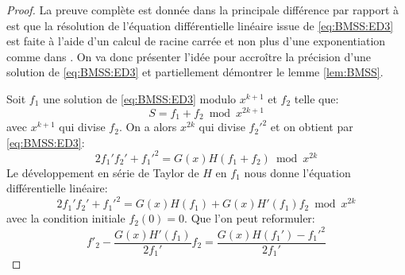\documentclass[10pt,a4paper]{book}
\theoremstyle{plain}
\theoremstyle{definition}
\theoremstyle{definition}
\theoremstyle{definition}
\theoremstyle{definition}
\theoremstyle{remark}
\theoremstyle{remark}
\begin{document}
\begin{proof}
La preuve complète est donnée dans \cite{Lercier-Sirvent2008} la principale différence par rapport à \cite{BMSS08} est que la résolution de l'équation différentielle linéaire issue de \eqref{eq:BMSS:ED3} est faite à l'aide d'un calcul de racine carrée et non plus d'une exponentiation comme dans \cite{BMSS08}. 
On va donc présenter l'idée pour accroître la précision d'une solution de \eqref{eq:BMSS:ED3} et partiellement démontrer le lemme \ref{lem:BMSS}.

Soit $f_1$ une solution de \eqref{eq:BMSS:ED3} modulo $x^{k+1}$ et $f_2$ telle que:
\begin{equation}
S=f_1+f_2 \bmod x^{2k+1}
\end{equation}
avec $x^{k+1}$ qui divise $f_2$. On a alors $x^{2k}$ qui divise $f_2'^2$ et on obtient par \eqref{eq:BMSS:ED3}:
\begin{equation}
\label{eq:BMSS:ED4}
2f_1'f_2'+f_1'^2=G(x)H(f_1+f_2) \bmod x^{2k}
\end{equation}
Le développement en série de Taylor de $H$ en $f_1$ nous donne l'équation différentielle linéaire:
\begin{equation}
2f_1'f_2'+f_1'^2=G(x)H(f_1)+G(x)H'(f_1)f_2 \bmod x^{2k}
\end{equation}
avec la condition initiale $f_2(0)=0$. Que l'on peut reformuler:
\begin{equation}
\label{eq:LS08:diflin}
f'_2-\frac{G(x)H'(f_1)}{2f_1'}f_2=\frac{G(x)H(f_1')-f_1'^2}{2f_1'}
\end{equation}


\end{proof}
\end{document}
